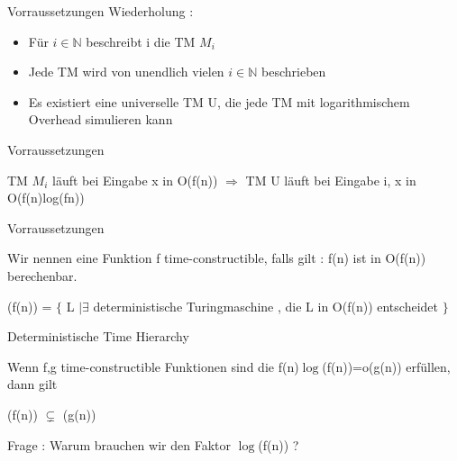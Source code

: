 \begin{frame}{Vorraussetzungen}
	Wiederholung :
	\begin{itemize}[<+->]
		\item Für $i\in \mathbb{N}$ beschreibt i die TM $M_i$
		\item Jede TM wird von unendlich vielen $i\in \mathbb{N}$ beschrieben
		\item Es existiert eine universelle TM U, die jede TM mit logarithmischem Overhead 					simulieren kann
	\end{itemize}
\end{frame}
\begin{frame}{Vorraussetzungen}
	\begin{Beispiel}[Universelle TM]
	TM $M_i$ läuft bei Eingabe x in O(f(n))
	$\Rightarrow$ TM U läuft bei Eingabe i, x in O(f(n)log(fn))
	\end{Beispiel}
\end{frame}
\begin{frame}{Vorraussetzungen}
	\begin{Definition}
		Wir nennen eine Funktion f time-constructible, falls gilt : \newline
		f(n) ist in O(f(n)) berechenbar. 
	\end{Definition}
	
	\pause	
	
	\begin{Definition}
		\DTIME(f(n)) = $\lbrace$ L $\vert \exists$ deterministische Turingmaschine ,
		 die L in O(f(n)) entscheidet $\rbrace$
	\end{Definition}
\end{frame}
\begin{frame}{Deterministische Time Hierarchy}
	\begin{Satz}
	Wenn f,g  time-constructible Funktionen sind die  
	f(n)$\log$(f(n))=o(g(n)) erfüllen, dann gilt

		\DTIME(f(n)) $\subsetneq$ \DTIME(g(n))
		
	\end{Satz}
	
	\pause

	Frage : Warum brauchen wir den Faktor $\log$(f(n)) ?
\end{frame}

